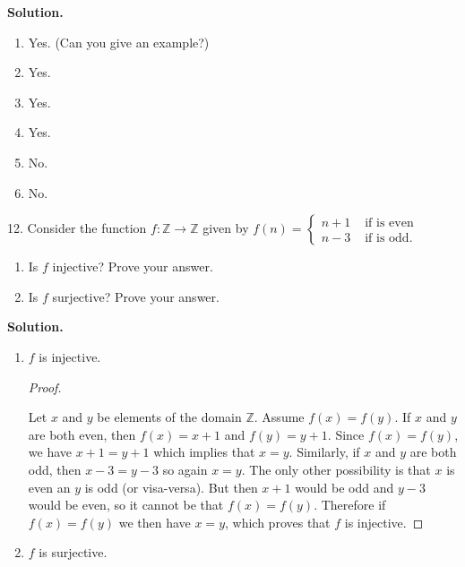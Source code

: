 \documentclass[10pt,]{book}
\theoremstyle{plain}
\theoremstyle{definition}
\theoremstyle{definition}
\theoremstyle{definition}
\numberwithin{equation}{section}
\def\Z{\mathbb Z}
\newcommand{\amp}{ & }
\begin{document}
\begin{exerciselist}
\par\smallskip
\par\smallskip
\noindent\textbf{Solution.}\hypertarget{solution-55}{}\quad
\leavevmode%
\begin{enumerate}[label=(\alph*)]
\item\hypertarget{li-351}{}
Yes. (Can you give an example?)
%
\item\hypertarget{li-352}{}
Yes.
%
\item\hypertarget{li-353}{}
Yes.
%
\item\hypertarget{li-354}{}
Yes.
%
\item\hypertarget{li-355}{}
No.
%
\item\hypertarget{li-356}{}
No.
%
\end{enumerate}
\item[12.]\hypertarget{exercise-38}{}
Consider the function \(f:\Z \to \Z\) given by \(f(n) = \begin{cases}n+1 \amp  \mbox{ if  is even} \\
                                                                 n-3 \amp  \mbox{ if  is odd} .
\end{cases}\)
%
\leavevmode%
\begin{enumerate}[label=(\alph*)]
\item\hypertarget{li-357}{}
Is \(f\) injective?  Prove your answer.
%
\item\hypertarget{li-358}{}
Is \(f\) surjective?  Prove your answer.
%
\end{enumerate}
\par\smallskip
\par\smallskip
\noindent\textbf{Solution.}\hypertarget{solution-56}{}\quad
\leavevmode%
\begin{enumerate}[label=(\alph*)]
\item\hypertarget{li-359}{}\(f\) is injective.

\begin{proof}\hypertarget{proof-1}{}

Let \(x\) and \(y\) be elements of the domain \(\Z\). Assume \(f(x) = f(y)\). If \(x\) and \(y\) are both even, then \(f(x) = x+1\) and \(f(y) = y+1\). Since \(f(x) = f(y)\), we have \(x + 1 = y + 1\) which implies that \(x = y\). Similarly, if \(x\) and \(y\) are both odd, then \(x - 3 = y-3\) so again \(x = y\). The only other possibility is that \(x\) is even an \(y\) is odd (or visa-versa). But then \(x + 1\) would be odd and \(y - 3\) would be even, so it cannot be that \(f(x) = f(y)\). Therefore if \(f(x) = f(y)\) we then have \(x = y\), which proves that \(f\) is injective.
%
\end{proof}
\item\hypertarget{li-360}{}\(f\) is surjective.


\end{enumerate}
\end{exerciselist}
\end{document}
